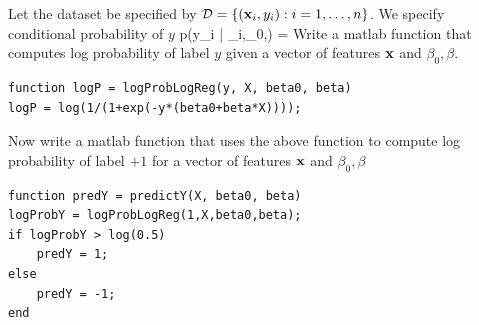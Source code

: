 \documentclass{article}
\begin{document}
\newproblem{1pt}
Let the dataset be specified by $\mathcal{D} = \left\{ (\mathbf{x}_i,y_i):i=1,\dots,n \right\}$. We specify conditional probability of $y$
\BEQ \label{eq:plr}
p(y_i | \xx_i,\beta_0,\beta) = 
\EEQ
Write a matlab function that computes log probability of label $y$ given a vector of features $\mathbf{x}$ and $\beta_0,\beta$.
\begin{verbatim}
function logP = logProbLogReg(y, X, beta0, beta)
logP = log(1/(1+exp(-y*(beta0+beta*X))));
\end{verbatim}
Now write a matlab function that uses the above function to compute log probability of label $+1$ for a vector of features $\mathbf{x}$ and $\beta_0,\beta$
\begin{verbatim}
function predY = predictY(X, beta0, beta)
logProbY = logProbLogReg(1,X,beta0,beta);
if logProbY > log(0.5)
    predY = 1;
else
    predY = -1;
end
\end{verbatim}
\end{document}
